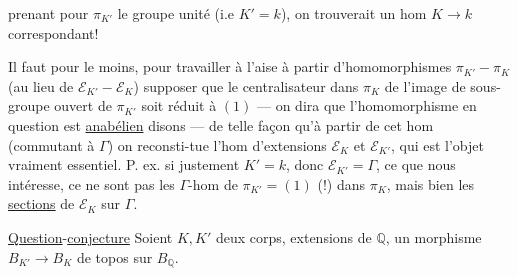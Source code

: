 prenant pour $\pi_{K'}$ le groupe unité (i.e $K'=k$), on trouverait un hom $K\longrightarrow k$ correspondant!

Il faut pour le moins, pour travailler à l'aise à partir d'homomorphismes $\pi_{K'}-\pi_K$ (au lieu de $\mathcal E_{K'}-\mathcal E_K$) supposer que le centralisateur dans $\pi_K$ de l'image de  sous-groupe ouvert de $\pi_{K'}$ soit réduit à $(1)$ --- on dira que l'homomorphisme en question est \uline{anabélien} disons --- de telle façon qu'à partir de cet hom (commutant à $\Gamma$) on reconsti-tue l'hom d'extensions $\mathcal E_K$ et $\mathcal E_{K'}$, qui est l'objet vraiment essentiel. P. ex. si justement $K'=k$, donc $\mathcal E_{K'}=\Gamma$, ce que nous intéresse, ce ne sont pas les $\Gamma$-hom de $\pi_{K'}=(1)$ (!) dans $\pi_K$, mais bien les \uline{sections} de $\mathcal E_K$ sur $\Gamma$.

\uline{Question}-\uline{conjecture} Soient $K,K'$ deux corps, extensions   de $\mathbb Q$,   un morphisme $B_{K'}\longrightarrow B_K$ de topos sur $B_{\mathbb Q}$.

